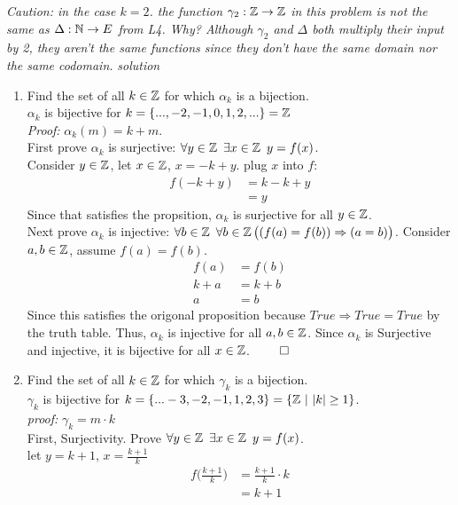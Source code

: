 \documentclass[11pt,twoside]{amsart}
\theoremstyle{definition}
\begin{document}
\textit{Caution: in the case $k = 2$. the function $\gamma_2 : \operatorname*{\mathbb{Z}} \to \operatorname*{\mathbb{Z}}$ in this problem is not the same as $\Delta : \operatorname*{\mathbb{N}} \to E$ from L4. Why? Although $\gamma_2$ and $\Delta$ both multiply their input by 2, they aren't the same functions since they don't have the same domain nor the same codomain.} \newpage 
\emph{solution}
    \begin{enumerate}[label= 1.\arabic*, itemsep=0.4cm]
        \item %
          Find the set of all $k \in \operatorname*{\mathbb{Z}}$ for which $\alpha_k$ is a bijection.\\
          $\alpha_k$ is bijective for $k = \{ ...,-2,-1,0,1,2,...\} =  \Z \medskip $\\
          \textit{Proof:} $\alpha_k(m) = k + m$.\\
          First prove $\alpha_k$ is surjective: $\forall y \in \Z \ \exists x \in \Z \ y = f(x)$. \\ Consider $y \in \operatorname*{\mathbb{Z}}$, let $x \in \operatorname*{\mathbb{Z}}$,  $x= -k +y$. plug $x$ into $f$:
          \begin{align*}
            f(-k+y) &= k-k+y\\
                    &= y
          \end{align*}
          Since that satisfies the propsition, $\alpha_k$ is surjective for all $y \in \operatorname*{\mathbb{Z}}$.\\
          Next prove $\alpha_k$ is injective: $\forall b \in \operatorname*{\mathbb{Z}} \ \forall b \in \operatorname*{\mathbb{Z}} \big( (f(a) = f(b)) \Rightarrow (a=b) \big)$.
          Consider $a,b \in \operatorname*{\mathbb{Z}}$, assume $f(a)=f(b)$.
          \begin{align*}
            f(a) &= f(b) \\
            k + a &= k + b\\
            a&=b
          \end{align*}
          Since this satisfies the origonal proposition because $True \Rightarrow True = True$ by the truth table. Thus, $\alpha_k$ is injective  for all $a,b \in \operatorname*{\mathbb{Z}}$.
          Since $\alpha_k$ is Surjective and injective, it is bijective for all $x \in \operatorname*{\mathbb{Z}}$. $\qed$
        
          
        \item %
          Find the set of all $k \in \operatorname*{\mathbb{Z}}$ for which $\gamma_k$ is a bijection.\\
          $\gamma_k$ is bijective for $k = \{...-3,-2,-1,1,2,3\} = \{\operatorname*{\mathbb{Z}} \ \lvert \ |k| \geq 1 \}$.\\
          \textit{proof:} $\gamma_k = m \cdot k$\\
          First, Surjectivity. Prove $\forall y \in \Z \ \exists x \in \Z \ y = f(x)$. \\
          let $y=k+1$, $x = \frac{k+1}{k}$
          \begin{align*}
            f\Big(\frac{k+1}{k}\Big) &= \frac{k+1}{k} \cdot k \\
             &= k+1 
          \end{align*}


\end{enumerate}
\end{document}
